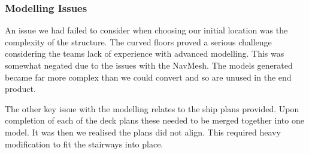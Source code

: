 \subsubsection{Modelling Issues}

An issue we had failed to consider when choosing our initial location
was the complexity of the structure. The curved floors proved a serious
challenge considering the teams lack of experience with advanced modelling.
This was somewhat negated due to the issues with the NavMesh. The
models generated became far more complex than we could convert and
so are unused in the end product.

The other key issue with the modelling relates to the ship plans provided.
Upon completion of each of the deck plans these needed to be merged
together into one model. It was then we realised the plans did not
align. This required heavy modification to fit the stairways into
place.

